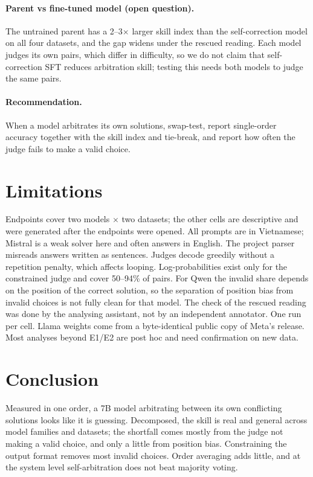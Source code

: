 \documentclass[11pt]{article}
\begin{document}
\paragraph{Parent vs fine-tuned model (open question).} The untrained parent has a 2--3$\times$ larger skill
index than the self-correction model on all four datasets, and the gap widens under the rescued reading. Each
model judges its own pairs, which differ in difficulty, so we do not claim that self-correction SFT reduces
arbitration skill; testing this needs both models to judge the same pairs.
\paragraph{Recommendation.} When a model arbitrates its own solutions, swap-test, report single-order accuracy
together with the skill index and tie-break, and report how often the judge fails to make a valid choice.

\section{Limitations}
Endpoints cover two models $\times$ two datasets; the other cells are descriptive and were generated after the
endpoints were opened. All prompts are in Vietnamese; Mistral is a weak solver here and often answers in
English. The project parser misreads answers written as sentences. Judges decode greedily without a
repetition penalty, which affects looping. Log-probabilities exist only for the constrained judge and cover
50--94\% of pairs. For Qwen the invalid share depends on the position of the correct solution, so the
separation of position bias from invalid choices is not fully clean for that model. The check of the rescued
reading was done by the analysing assistant, not by an independent annotator. One run per cell. Llama weights come from a byte-identical public copy of Meta's
release. Most analyses beyond E1/E2 are post hoc and need confirmation on new data.

\section{Conclusion}
Measured in one order, a 7B model arbitrating between its own conflicting solutions looks like it is guessing.
Decomposed, the skill is real and general across model families and datasets; the shortfall comes mostly from
the judge not making a valid choice, and only a little from position bias. Constraining the output format removes most
invalid choices. Order averaging adds little, and at the system level self-arbitration does not beat majority
voting.
\end{document}
